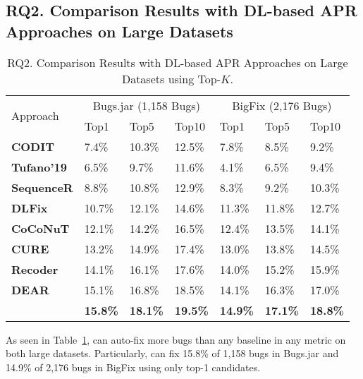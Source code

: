 \subsection{\bf RQ2. Comparison Results with DL-based APR Approaches on Large Datasets}
\label{rq2:sec}

\begin{table}[t]
	\caption{RQ2. Comparison Results with DL-based APR Approaches on Large Datasets using Top-$K$.}
	\vspace{-10pt}
        {\small
	\begin{center}
		\renewcommand{\arraystretch}{1}
		\begin{tabular}{p{1.6cm}|p{0.7cm}|p{0.7cm}|p{0.7cm}|p{0.7cm}|p{0.7cm}|p{0.7cm}}\hline
			\multirow{2}{*}{Approach}&\multicolumn{3}{c|}{Bugs.jar (1,158 Bugs)}&\multicolumn{3}{c}{BigFix (2,176 Bugs)}\\\cline{2-7}
		                          & Top1   & Top5   & Top10  & Top1   & Top5   & Top10\\
			\hline
			\textbf{CODIT}        & 7.4\%  & 10.3\% & 12.5\% & 7.8\%  & 8.5\%  & 9.2\%\\
			\textbf{Tufano'19}  & 6.5\%  & 9.7\%  & 11.6\% & 4.1\%  & 6.5\%  & 9.4\%\\
			\textbf{SequenceR}    & 8.8\%  & 10.8\% & 12.9\% & 8.3\%  & 9.2\%  & 10.3\%\\
			\textbf{DLFix}        & 10.7\% & 12.1\% & 14.6\% & 11.3\% & 11.8\% & 12.7\%\\
			\textbf{CoCoNuT}      & 12.1\% & 14.2\% & 16.5\% & 12.4\% & 13.5\% & 14.1\%\\
			\textbf{CURE}         & 13.2\% & 14.9\% & 17.4\% & 13.0\% & 13.8\% & 14.5\%\\
                        \textbf{Recoder}         & 14.1\% & 16.1\% & 17.6\% & 14.0\% & 15.2\% & 15.9\%\\
                        \textbf{DEAR}         & 15.1\% & 16.8\% & 18.5\% & 14.1\% & 16.3\% & 17.0\%\\
			\hline
			\textbf{\tool}        & \textbf{15.8\%} & \textbf{18.1\%} & \textbf{19.5\%} & \textbf{14.9\%} & \textbf{17.1\%} & \textbf{18.8\%}\\
			\hline
		\end{tabular}
		\label{RQ2_results}
	\end{center}
        }
\end{table}


As seen in Table~\ref{RQ2_results}, {\tool} can auto-fix more bugs
than any baseline in any metric on both large datasets.  Particularly,
{\tool} can fix 15.8\% of 1,158 bugs in Bugs.jar and 14.9\% of 2,176
bugs in BigFix using only top-1 candidates.




